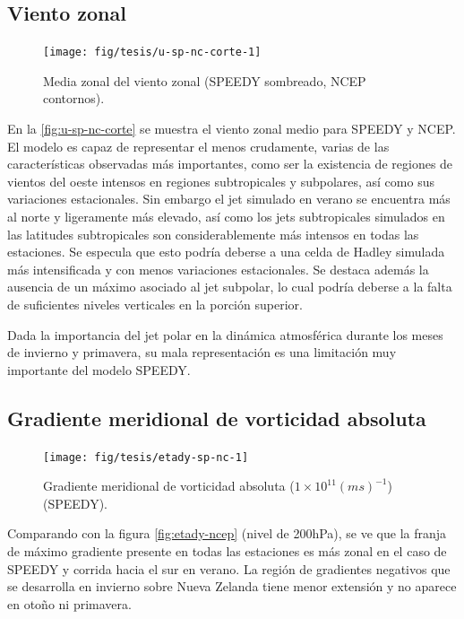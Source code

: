 \documentclass[spanish,a4paper,12pt,oneside]{book}
\begin{document}
\subsection{Viento zonal}\label{viento-zonal-1}

\begin{figure}
\texttt{[image: fig/tesis/u-sp-nc-corte-1]} \caption{Media zonal del viento zonal (SPEEDY sombreado, NCEP contornos).}\label{fig:u-sp-nc-corte}
\end{figure}

En la \autoref{fig:u-sp-nc-corte} se muestra el viento zonal medio para
SPEEDY y NCEP. El modelo es capaz de representar el menos crudamente,
varias de las características observadas más importantes, como ser la
existencia de regiones de vientos del oeste intensos en regiones
subtropicales y subpolares, así como sus variaciones estacionales. Sin
embargo el jet simulado en verano se encuentra más al norte y
ligeramente más elevado, así como los jets subtropicales simulados en
las latitudes subtropicales son considerablemente más intensos en todas
las estaciones. Se especula que esto podría deberse a una celda de
Hadley simulada más intensificada y con menos variaciones estacionales.
Se destaca además la ausencia de un máximo asociado al jet subpolar, lo
cual podría deberse a la falta de suficientes niveles verticales en la
porción superior.

Dada la importancia del jet polar en la dinámica atmosférica durante los
meses de invierno y primavera, su mala representación es una limitación
muy importante del modelo SPEEDY.

\subsection{Gradiente meridional de vorticidad
absoluta}\label{gradiente-meridional-de-vorticidad-absoluta}

\begin{landscape}\begin{figure}

{\centering \texttt{[image: fig/tesis/etady-sp-nc-1]} 

}

\caption{Gradiente meridional de vorticidad absoluta ($1\times10^{11}(ms)^{-1}$) (SPEEDY).}\label{fig:etady-sp-nc}
\end{figure}
\end{landscape}

Comparando con la figura \autoref{fig:etady-ncep} (nivel de 200hPa), se
ve que la franja de máximo gradiente presente en todas las estaciones es
más zonal en el caso de SPEEDY y corrida hacia el sur en verano. La
región de gradientes negativos que se desarrolla en invierno sobre Nueva
Zelanda tiene menor extensión y no aparece en otoño ni primavera.
\end{document}
